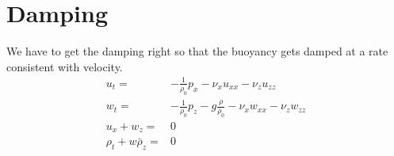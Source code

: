 \documentclass[11pt]{article}
\begin{document}
%
\section{Damping}
%

We have to get the damping right so that the buoyancy gets damped at a rate consistent with velocity.
\begin{subequations}{}
\begin{align}
\label{x-momentum-bq}
u_t =& - \frac{1}{\rho_0} p_x - \nu_x u_{xx} - \nu_z u_{zz} \\ \label {z-momentum-bq}
w_t =& - \frac{1}{\rho_0} p_z - g \frac{\rho}{\rho_0}  - \nu_x w_{xx} - \nu_z w_{zz} \\ \label{continuity-bq}
u_x + w_z =& 0 \\ \label{thermodynamic-bq}
\rho_t + w \bar{\rho}_z =& 0
\end{align}
\end{subequations}
\end{document}
